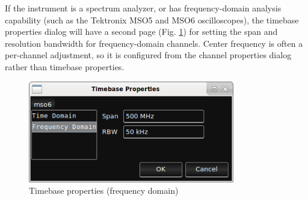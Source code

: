 If the instrument is a spectrum analyzer, or has frequency-domain analysis capability (such as the Tektronix MSO5 and
MSO6 oscilloscopes), the timebase properties dialog will have a second page (Fig. \ref{timebase-properties-freq}) for
setting the span and resolution bandwidth for frequency-domain channels. Center frequency is often a per-channel
adjustment, so it is configured from the channel properties dialog rather than timebase properties.

\begin{figure}[h]
\centering
\includegraphics[width=9cm]{images/timebase-properties-freq.png}
\caption{Timebase properties (frequency domain)}
\label{timebase-properties-freq}
\end{figure}
